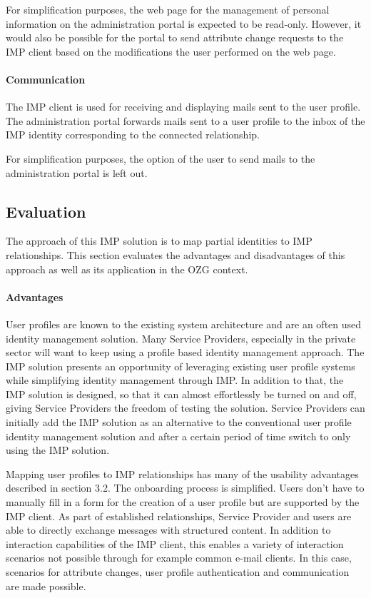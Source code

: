 For simplification purposes, the web page for the management of personal information on the administration portal is expected to be read-only. However, it would also be possible for the portal to send attribute change requests to the IMP client based on the modifications the user performed on the web page.

\paragraph{Communication}

The IMP client is used for receiving and displaying mails sent to the user profile. The administration portal forwards mails sent to a user profile to the inbox of the IMP identity corresponding to the connected relationship.

For simplification purposes, the option of the user to send mails to the administration portal is left out.

\subsection{Evaluation}

The approach of this IMP solution is to map partial identities to IMP relationships. This section evaluates the advantages and disadvantages of this approach as well as its application in the OZG context.

\paragraph{Advantages}

User profiles are known to the existing system architecture and are an often used identity management solution. Many Service Providers, especially in the private sector will want to keep using a profile based identity management approach. The IMP solution presents an opportunity of leveraging existing user profile systems while simplifying identity management through IMP. In addition to that, the IMP solution is designed, so that it can almost effortlessly be turned on and off, giving Service Providers the freedom of testing the solution. Service Providers can initially add the IMP solution as an alternative to the conventional user profile identity management solution and after a certain period of time switch to only using the IMP solution.

Mapping user profiles to IMP relationships has many of the usability advantages described in section 3.2. The onboarding process is simplified. Users don't have to manually fill in a form for the creation of a user profile but are supported by the IMP client. As part of established relationships, Service Provider and users are able to directly exchange messages with structured content. In addition to interaction capabilities of the IMP client, this enables a variety of interaction scenarios not possible through for example common e-mail clients. In this case, scenarios for attribute changes, user profile authentication and communication are made possible.

